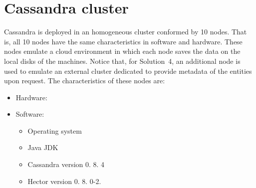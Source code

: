 % 	
% 			
% 			


\section{Cassandra cluster} \label{sexp:CassandraCluster}
Cassandra is deployed in an homogeneous cluster conformed by 10 nodes. That is,
 all 10 nodes have the same characteristics in software and hardware. These
 nodes emulate a cloud environment in which each node saves
 the data on the local disks of the machines. Notice that, for Solution~4,  an
 additional node is used to emulate an external cluster dedicated to provide
 metadata of the entities upon request.
 The characteristics of these nodes are:


\begin{itemize}
  \item Hardware: 
  	\begin{itemize}
  	  
  	 \end{itemize}
  \item Software: 
  \begin{itemize}
    \item Operating system
    \item Java JDK
    \item Cassandra version 0. 8. 4 
    \item Hector version 0. 8. 0-2.
  \end{itemize}
\end{itemize}


